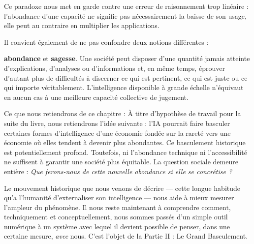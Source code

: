 Ce paradoxe nous met en garde contre une erreur de raisonnement trop linéaire : l'abondance d'une capacité ne signifie pas nécessairement la baisse de son usage, elle peut au contraire en multiplier les applications.

Il convient également de ne pas confondre deux notions différentes :

\textbf{abondance} et \textbf{sagesse}. Une société peut disposer d'une quantité jamais atteinte d'explications, d'analyses ou d'informations et, en même temps, éprouver d'autant plus de difficultés à discerner ce qui est pertinent, ce qui est juste ou ce qui importe véritablement. L'intelligence disponible à grande échelle n'équivaut en aucun cas à une meilleure capacité collective de jugement.

Ce que nous retiendrons de ce chapitre : À titre d'hypothèse de travail pour la suite du livre, nous retiendrons l'idée suivante : l'IA pourrait faire basculer certaines formes d'intelligence d'une économie fondée sur la rareté vers une économie où elles tendent à devenir plus abondantes. Ce basculement historique est potentiellement profond. Toutefois, ni l'abondance technique ni l'accessibilité ne suffisent à garantir une société plus équitable. La question sociale demeure entière : \emph{Que ferons-nous de cette nouvelle abondance si elle se concrétise ?}

Le mouvement historique que nous venons de décrire — cette longue habitude qu'a l'humanité d'externaliser son intelligence — nous aide à mieux mesurer l'ampleur du phénomène. Il nous reste maintenant à comprendre comment, techniquement et conceptuellement, nous sommes passés d'un simple outil numérique à un système avec lequel il devient possible de penser, dans une certaine mesure, \emph{avec} nous. C'est l'objet de la Partie II : Le Grand Basculement.
